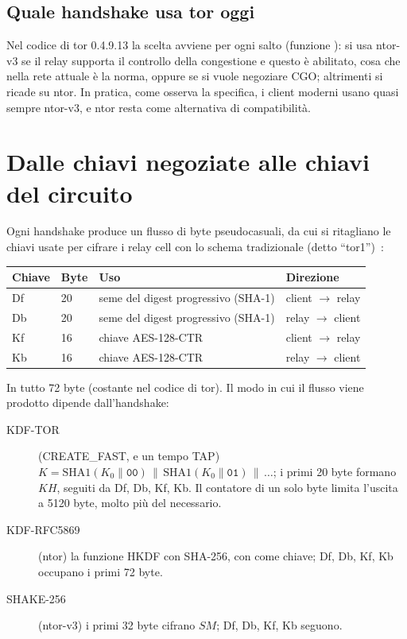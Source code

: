 \subsection{Quale handshake usa tor oggi}

Nel codice di tor 0.4.9.13 la scelta avviene per ogni salto (funzione ): si usa ntor-v3 se il relay supporta il controllo della congestione e questo è abilitato, cosa che nella rete attuale è la norma, oppure se si vuole negoziare CGO; altrimenti si ricade su ntor. In pratica, come osserva la specifica, i client moderni usano quasi sempre ntor-v3, e ntor resta come alternativa di compatibilità.

\section{Dalle chiavi negoziate alle chiavi del circuito}\label{sec:circ-chiavi}

Ogni handshake produce un flusso di byte pseudocasuali, da cui si ritagliano le chiavi usate per cifrare i relay cell con lo schema tradizionale (detto \enquote{tor1})~:

\begin{center}
\begin{tabular}{llll}
\toprule
Chiave & Byte & Uso & Direzione \\
\midrule
Df & 20 & seme del digest progressivo (SHA-1) & client $\to$ relay \\
Db & 20 & seme del digest progressivo (SHA-1) & relay $\to$ client \\
Kf & 16 & chiave AES-128-CTR & client $\to$ relay \\
Kb & 16 & chiave AES-128-CTR & relay $\to$ client \\
\bottomrule
\end{tabular}
\end{center}

In tutto 72 byte (costante  nel codice di tor). Il modo in cui il flusso viene prodotto dipende dall'handshake:
\begin{description}
  \item[KDF-TOR] (CREATE\_FAST, e un tempo TAP) $K = \mathrm{SHA1}(K_0 \| \texttt{00}) \,\|\, \mathrm{SHA1}(K_0 \| \texttt{01}) \,\|\, \ldots$; i primi 20 byte formano $KH$, seguiti da Df, Db, Kf, Kb. Il contatore di un solo byte limita l'uscita a 5120 byte, molto più del necessario.
  \item[KDF-RFC5869] (ntor) la funzione HKDF con SHA-256, con  come chiave; Df, Db, Kf, Kb occupano i primi 72 byte.
  \item[SHAKE-256] (ntor-v3) i primi 32 byte cifrano $SM$; Df, Db, Kf, Kb seguono.
\end{description}

